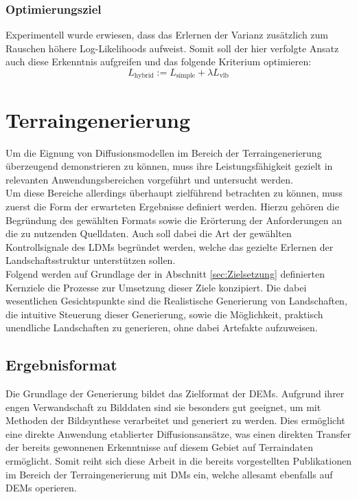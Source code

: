 \subsubsection {Optimierungsziel}

Experimentell wurde erwiesen, dass das Erlernen der Varianz zusätzlich zum Rauschen höhere Log-Likelihoods aufweist. Somit soll der hier verfolgte Ansatz auch diese Erkenntnis aufgreifen und das folgende Kriterium optimieren:
\begin{equation}
    L_\text{hybrid} := L_\text{simple} + \lambda L_\text{vlb}
\end{equation}

\section {Terraingenerierung}
\label{sec:Terraingenerierung}

Um die Eignung von Diffusionsmodellen im Bereich der Terraingenerierung überzeugend demonstrieren zu können, muss ihre Leistungsfähigkeit gezielt in relevanten Anwendungsbereichen vorgeführt und untersucht werden. \\
Um diese Bereiche allerdings überhaupt zielführend betrachten zu können, muss zuerst die Form der erwarteten Ergebnisse definiert werden. Hierzu gehören die Begründung des gewählten Formats sowie die Erörterung der Anforderungen an die zu nutzenden Quelldaten. Auch soll dabei die Art der gewählten Kontrollsignale des \ac{LDM}s begründet werden, welche das gezielte Erlernen der Landschaftsstruktur unterstützen sollen. \\
Folgend werden auf Grundlage der in Abschnitt \ref{sec:Zielsetzung} definierten Kernziele die Prozesse zur Umsetzung dieser Ziele konzipiert. Die dabei wesentlichen Gesichtspunkte sind die Realistische Generierung von Landschaften, die intuitive Steuerung dieser Generierung, sowie die Möglichkeit, praktisch unendliche Landschaften zu generieren, ohne dabei Artefakte aufzuweisen. 

\subsection {Ergebnisformat}
\label{subsec:Ergebnisformat}

Die Grundlage der Generierung bildet das Zielformat der \ac{DEM}s. Aufgrund ihrer engen Verwandschaft zu Bilddaten sind sie besonders gut geeignet, um mit Methoden der Bildsynthese verarbeitet und generiert zu werden. Dies ermöglicht eine direkte Anwendung etablierter Diffusionsansätze, was einen direkten Transfer der bereits gewonnenen Erkenntnisse auf diesem Gebiet auf Terraindaten ermöglicht. Somit reiht sich diese Arbeit in die bereits vorgestellten Publikationen im Bereich der Terraingenerierung mit \ac{DM}s ein, welche allesamt ebenfalls auf \ac{DEM}s operieren.

